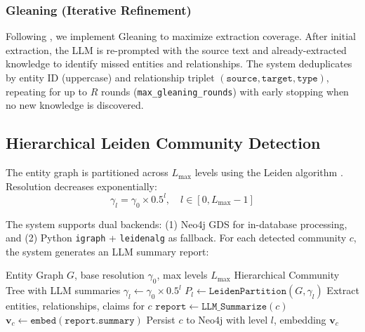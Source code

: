 \documentclass[11pt]{article}
\begin{document}
\subsubsection{Gleaning (Iterative Refinement)}

Following \citet{edge2024graphrag}, we implement Gleaning to maximize extraction coverage. After initial extraction, the LLM is re-prompted with the source text and already-extracted knowledge to identify missed entities and relationships. The system deduplicates by entity ID (uppercase) and relationship triplet $(\texttt{source}, \texttt{target}, \texttt{type})$, repeating for up to $R$ rounds (\texttt{max\_gleaning\_rounds}) with early stopping when no new knowledge is discovered.

\subsection{Hierarchical Leiden Community Detection}

The entity graph is partitioned across $L_{\max}$ levels using the Leiden algorithm \citep{traag2019leiden}. Resolution decreases exponentially:
\begin{equation}
\gamma_l = \gamma_0 \times 0.5^l, \quad l \in [0, L_{\max}-1]
\end{equation}

The system supports dual backends: (1) Neo4j GDS for in-database processing, and (2) Python \texttt{igraph} + \texttt{leidenalg} as fallback. For each detected community $c$, the system generates an LLM summary report:

\begin{algorithm}[t]
\caption{Hierarchical Leiden Detection \& Summarization}
\label{alg:leiden}
\footnotesize
\begin{algorithmic}[1]
\REQUIRE Entity Graph $G$, base resolution $\gamma_0$, max levels $L_{\max}$
\ENSURE Hierarchical Community Tree with LLM summaries
    \STATE $\gamma_l \leftarrow \gamma_0 \times 0.5^l$
    \STATE $P_l \leftarrow \texttt{LeidenPartition}(G, \gamma_l)$
        \STATE Extract entities, relationships, claims for $c$
        \STATE $\texttt{report} \leftarrow \texttt{LLM\_Summarize}(c)$
        \STATE {}
        \STATE $\mathbf{v}_c \leftarrow \texttt{embed}(\texttt{report.summary})$
        \STATE Persist $c$ to Neo4j with level $l$, embedding $\mathbf{v}_c$
    \ENDFOR
\ENDFOR
\end{algorithmic}
\end{algorithm}
\end{document}
